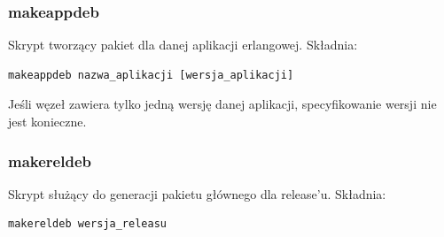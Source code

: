 \documentclass[polish,12pt]{aghthesis}
\begin{document}
\begin{itemize}
\subsubsection{makeappdeb}
Skrypt tworzący pakiet dla danej aplikacji erlangowej. Składnia:
\begin{verbatim}
makeappdeb nazwa_aplikacji [wersja_aplikacji]
\end{verbatim}
Jeśli węzeł zawiera tylko jedną wersję danej aplikacji, specyfikowanie wersji nie jest konieczne.
\subsubsection{makereldeb}
Skrypt służący do generacji pakietu głównego dla release'u. Składnia:
\begin{verbatim}
makereldeb wersja_releasu
\end{verbatim}

\end{itemize}
\end{document}

